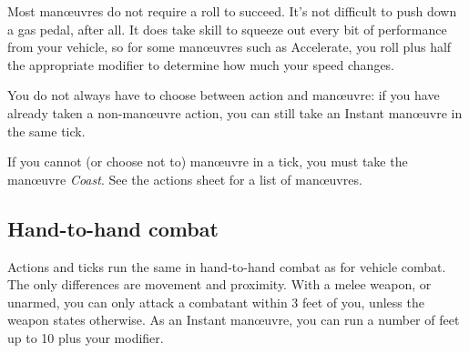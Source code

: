 \documentclass[10pt, a4paper, twocolumn]{article}
\begin{document}
Most man\oe{}uvres do not require a roll to succeed. It's not difficult to push
down a gas pedal, after all. It does take skill to squeeze out every bit of
performance from your vehicle, so for some man\oe{}uvres such as Accelerate, you
roll  plus half the appropriate modifier to determine how much your
speed changes.

You do not always have to choose between action and man\oe{}uvre: if you have
already taken a non-man\oe{}uvre action, you can still take an Instant
man\oe{}uvre in the same tick.

If you cannot (or choose not to) man\oe{}uvre in a tick, you must take the
man\oe{}uvre \emph{Coast}. See the actions sheet for a list of man\oe{}uvres.

\subsection{Hand-to-hand combat}

Actions and ticks run the same in hand-to-hand combat as for vehicle combat. The only
differences are movement and proximity. With a melee weapon, or unarmed, you can
only attack a combatant within 3 feet of you, unless the weapon states
otherwise. As an Instant man\oe{}uvre, you can run a number of feet up to 10
plus your  modifier. 
\end{document}
